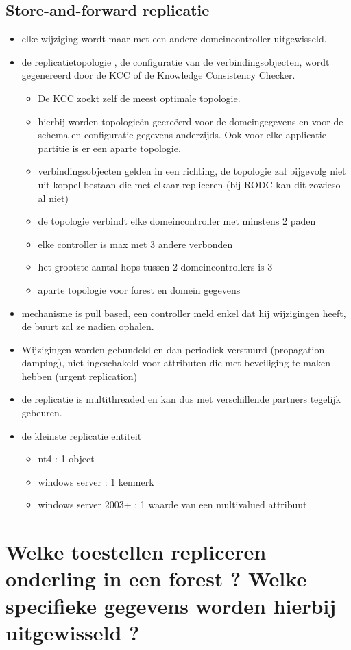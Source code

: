 \subsection{Store-and-forward replicatie}
\begin{itemize}
\item elke wijziging wordt maar met een andere domeincontroller uitgewisseld.
\item de replicatietopologie , de configuratie van de verbindingsobjecten, wordt gegenereerd door de KCC of de Knowledge Consistency Checker. 
\begin{itemize}
\item De KCC zoekt zelf de meest optimale topologie.
\item hierbij worden topologie\"en gecre\"eerd voor de domeingegevens en voor de schema en configuratie gegevens anderzijds. Ook voor elke applicatie partitie is er een aparte topologie.
\item verbindingsobjecten gelden in een richting, de topologie zal bijgevolg niet uit koppel bestaan die met elkaar repliceren (bij RODC kan dit zowieso al niet)
\item de topologie verbindt elke domeincontroller met minstens 2 paden
\item elke controller is max met 3 andere verbonden
\item het grootste aantal hops tussen 2 domeincontrollers is 3
\item aparte topologie voor forest en domein gegevens
\end{itemize}
\item mechanisme is pull based, een controller meld enkel dat hij wijzigingen heeft, de buurt zal ze nadien ophalen. 
\item Wijzigingen worden gebundeld en dan periodiek verstuurd (propagation damping), niet ingeschakeld voor attributen die met beveiliging te maken hebben (urgent replication)
\item de replicatie is multithreaded en kan dus met verschillende partners tegelijk gebeuren.
\item de kleinste replicatie entiteit
\begin{itemize}
\item nt4 : 1 object
\item windows server : 1 kenmerk
\item windows server 2003+ : 1 waarde van een multivalued attribuut
\end{itemize}
\end{itemize}
\clearpage
\section{Welke toestellen repliceren onderling in een forest ? Welke specifieke gegevens worden hierbij uitgewisseld ?}

